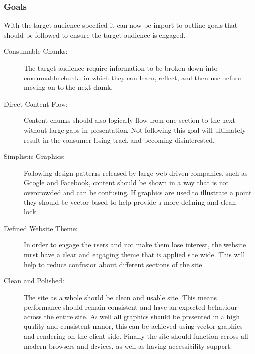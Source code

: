 

\subsubsection{Goals}\label{sec:goals}
With the target audience specified it can now be import to outline goals that should be followed to ensure the target audience is engaged.
\begin{description}
	\item[Consumable Chunks:] The target audience require information to be broken down into consumable chunks in which they can learn, reflect, and then use before moving on to the next chunk.
	\item[Direct Content Flow:] Content chunks should also logically flow from one section to the next without large gaps in presentation. Not following this goal will ultimately result in the consumer losing track and becoming disinterested.
	\item[Simplistic Graphics:] Following design patterns released by large web driven companies, such as Google and Facebook, content should be shown in a way that is not overcrowded and can be confusing. If graphics are used to illustrate a point they should be vector based to help provide a more defining and clean look.
	\item[Defined Website Theme:] In order to engage the users and not make them lose interest, the website must have a clear and engaging theme that is applied site wide. This will help to reduce confusion about different sections of the site.
	\item[Clean and Polished:] The site as a whole should be clean and usable site. This means performance should remain consistent and have an expected behaviour across the entire site. As well all graphics should be presented in a high quality and consistent manor, this can be achieved using vector graphics and rendering on the client side. Finally the site should function across all modern browsers and devices, as well as having accessibility support.
\end{description}


